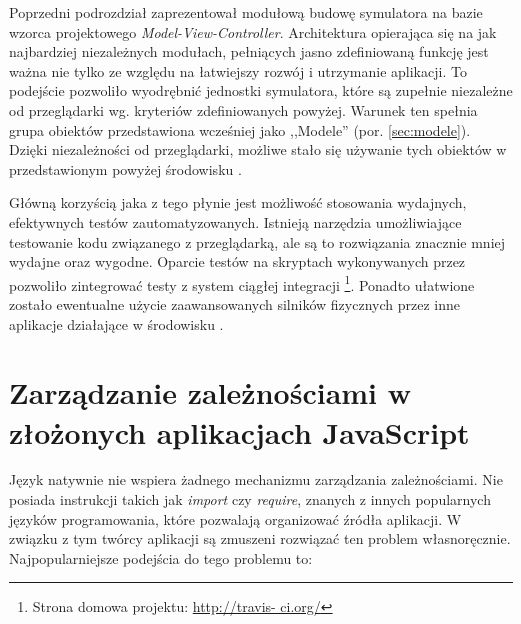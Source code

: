 Poprzedni podrozdział zaprezentował modułową budowę symulatora \en na bazie
wzorca projektowego \emph{Model-View-Controller}. Architektura opierająca  się
na jak najbardziej niezależnych modułach, pełniących jasno zdefiniowaną funkcję
jest ważna nie tylko ze względu na łatwiejszy rozwój i utrzymanie aplikacji. To
podejście pozwoliło wyodrębnić jednostki symulatora, które są zupełnie
niezależne od przeglądarki wg. kryteriów zdefiniowanych powyżej. Warunek ten
spełnia grupa obiektów przedstawiona wcześniej jako ,,Modele'' (por.
\ref{sec:modele}). Dzięki niezależności od przeglądarki, możliwe stało się
używanie tych obiektów w przedstawionym powyżej środowisku .

Główną korzyścią jaka z tego płynie jest możliwość stosowania wydajnych,
efektywnych testów zautomatyzowanych. Istnieją narzędzia umożliwiające
testowanie kodu \js związanego z przeglądarką, ale są to rozwiązania znacznie
mniej wydajne oraz wygodne. Oparcie testów na skryptach wykonywanych przez
 pozwoliło zintegrować testy z system ciągłej integracji \footnote{Strona domowa projektu: \url{http://travis-
ci.org/}}. Ponadto ułatwione zostało ewentualne użycie zaawansowanych silników
fizycznych \en przez inne aplikacje działające w środowisku .

\section{Zarządzanie zależnościami w złożonych aplikacjach JavaScript}

Język \js natywnie nie wspiera żadnego mechanizmu zarządzania zależnościami. Nie
posiada instrukcji takich jak \emph{import} czy \emph{require}, znanych z innych
popularnych języków programowania, które pozwalają organizować źródła aplikacji.
W związku z tym twórcy aplikacji są zmuszeni rozwiązać ten problem
własnoręcznie. Najpopularniejsze podejścia do tego problemu to:

